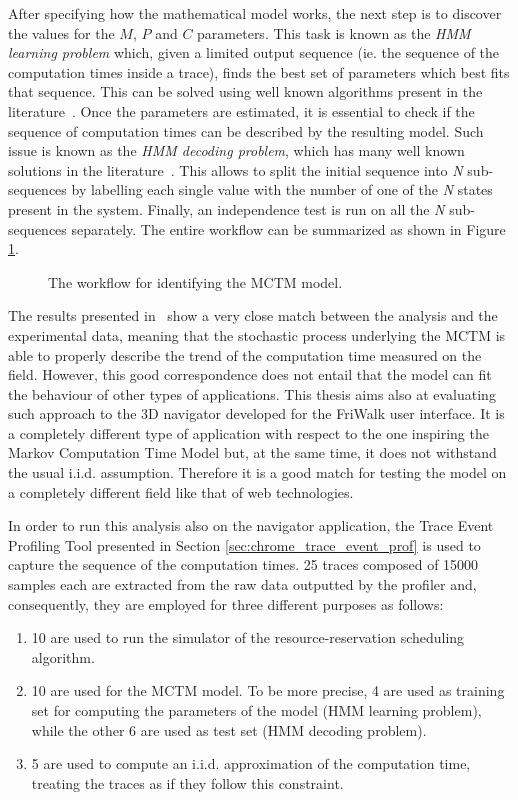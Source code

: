 After specifying how the mathematical model works, the next step is to discover
the values for the \(M\), \(P\) and \(C\) parameters. This task is known as the
\emph{HMM learning problem} which, given a limited output sequence (ie. the
sequence of the computation times inside a trace),
finds the best set of parameters which best fits that sequence.
This can be solved using well known algorithms present in the
literature~\cite{baum1972inequality}.
Once the parameters are estimated, it is essential to check if the sequence of
computation times can be described by the resulting model.
Such issue is known as the \emph{HMM decoding problem}, which has many well
known solutions in the literature~\cite{forney1973viterbi}. This allows to split
the initial sequence into \emph{N} sub-sequences by labelling each single value
with the number of one of the \emph{N} states present in the system.
Finally, an independence test is run on all the \emph{N} sub-sequences separately.
The entire workflow can be summarized as shown in Figure \ref{img:hmm_workflow}.
\begin{figure}[!htb]
    \caption{The workflow for identifying the MCTM model.}
    \label{img:hmm_workflow}
\end{figure}

The results presented in~\cite{frias2017probabilistic} show a very close match
between the analysis and the experimental data, meaning that the stochastic
process underlying the MCTM is able to properly describe the trend of the
computation time measured on the field.
However, this good correspondence does not entail that the model can fit the
behaviour of other types of applications. This thesis aims also at evaluating such
approach to the 3D navigator developed for the FriWalk user interface.
It is a completely different type of application with respect to the one
inspiring the Markov Computation Time Model but, at the same time, it does not
withstand the usual i.i.d. assumption. Therefore it is a good match for
testing the model on a completely different field like that of web technologies.

In order to run this analysis also on the navigator application, the Trace Event
Profiling Tool presented in Section \ref{sec:chrome_trace_event_prof} is used
to capture the sequence of the computation times. 25 traces composed of 15000
samples each are extracted from the raw data outputted by the profiler and,
consequently, they are employed for three different purposes as follows:
\begin{enumerate}
    \item 10 are used to run the simulator of the resource-reservation
        scheduling algorithm.
    \item 10 are used for the MCTM model. To be more precise, 4 are used as
        training set for computing the parameters of the model (HMM learning
        problem), while the other 6 are used as test set (HMM decoding problem).
    \item 5 are used to compute an i.i.d. approximation of the computation time,
        treating the traces as if they follow this constraint.
\end{enumerate}


